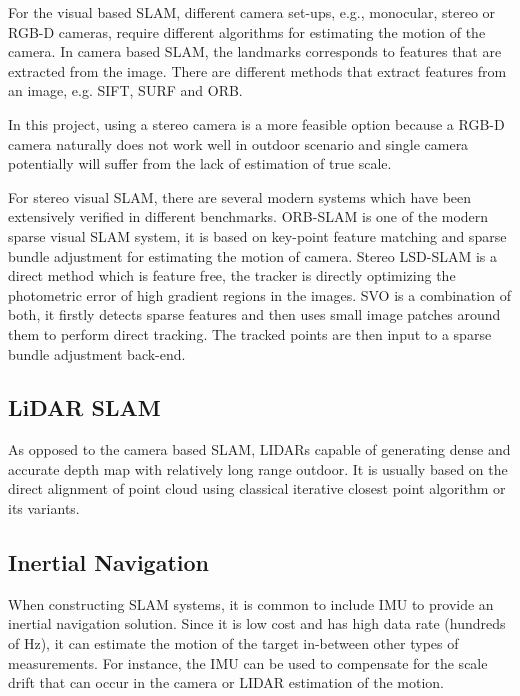 For the visual based \gls{SLAM}, different camera set-ups, e.g., monocular, 
stereo or RGB-D
cameras, require different algorithms for estimating the motion of
the camera. In camera based \gls{SLAM}, the landmarks corresponds to features 
that are extracted from the image. There are different methods that extract 
features from an image, e.g. \gls{SIFT}\cite{Lowe:1999:ORL:850924.851523},  
\gls{SURF}\cite{Bay:2008:SRF:1370312.1370556} and 
\gls{ORB}\cite{Rublee:2011:OEA:2355573.2356268}.

In this project, using a stereo camera is a more feasible option 
because a RGB-D camera naturally does not work well in outdoor scenario
and single camera potentially will suffer from the lack of estimation
of true scale.

For stereo visual \gls{SLAM}, there are several modern systems
which have been extensively verified in different
benchmarks. \gls{ORB}-\gls{SLAM}\cite{DBLP:journals/corr/Mur-ArtalT16a} is one 
of the modern sparse visual \gls{SLAM}
system, it is based on key-point feature matching and sparse bundle
adjustment for estimating the motion of camera. Stereo LSD-SLAM\cite{7353631} is
a direct method which is feature free, the tracker is directly
optimizing the photometric error of  high gradient regions in the
images. SVO\cite{7782863} is a combination of both, it firstly detects sparse
features and then uses small image patches around them to perform
direct tracking. The tracked points are then input to a sparse bundle
adjustment back-end.

\subsection{LiDAR SLAM}

As opposed to the camera based \gls{SLAM}, \gls{LIDAR}s capable
of generating dense and accurate depth map with relatively long range
outdoor. It is usually based on the direct alignment of point cloud
using classical iterative closest point algorithm or its variants. 

\subsection{Inertial Navigation}

When constructing \gls{SLAM} systems, it is common to include \gls{IMU} to 
provide an inertial navigation solution. Since it is low
cost and has high data rate (hundreds of Hz), it can estimate the motion of the 
target in-between other types of measurements. For instance, the \gls{IMU} can 
be used to compensate for the scale drift that can occur in the camera or 
\gls{LIDAR} estimation of the motion. 




